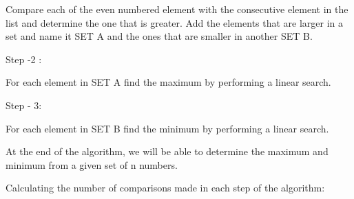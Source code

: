 \documentclass[letterpaper,portrait,12pt]{article}
\begin{document}
\begin{flushleft}
Compare each of the even numbered element with the consecutive element in the list and determine the one that is greater. Add the elements that are larger in a set and name it SET A and the ones that are smaller in another SET B.
\end{flushleft}


\begin{flushleft}

\end{flushleft}


\begin{flushleft}
Step -2 :
\end{flushleft}


\begin{flushleft}
For each element in SET A find the maximum by performing a linear search.
\end{flushleft}


\begin{flushleft}

\end{flushleft}


\begin{flushleft}
Step - 3:
\end{flushleft}


\begin{flushleft}
For each element in SET B find the minimum by performing a linear search.
\end{flushleft}


\begin{flushleft}

\end{flushleft}


\begin{flushleft}
At the end of the algorithm, we will be able to determine the maximum and minimum from a given set of n numbers.
\end{flushleft}


\begin{flushleft}

\end{flushleft}


\begin{flushleft}
Calculating the number of comparisons made in each step of the algorithm:
\end{flushleft}


\begin{flushleft}

\end{flushleft}
\end{document}
